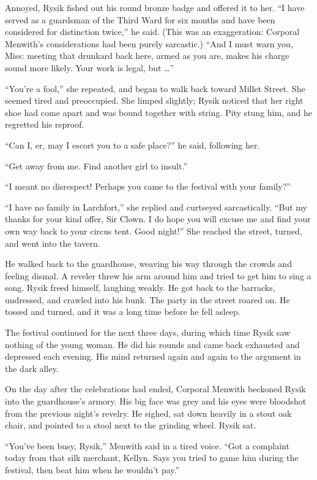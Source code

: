 \documentclass[10pt,a4paper]{article}
\begin{document}
Annoyed, Rysik fished out his round bronze badge and offered it to
her. ``I have served as a guardsman of the Third Ward for six months
and have been considered for distinction twice,'' he said. (This was
an exaggeration: Corporal Menwith's considerations had been purely
sarcastic.) ``And I must warn you, Miss: meeting that drunkard back
here, armed as you are, makes his charge sound more likely. Your
work is legal, but \ldots''

``You're a fool,'' she repeated, and began to walk back toward Millet
Street. She seemed tired and preoccupied. She limped slightly;
Rysik noticed that her right shoe had come apart and was bound
together with string. Pity stung him, and he regretted his reproof.

``Can I, er, may I escort you to a safe place?'' he said, following
her.

``Get away from me. Find another girl to insult.''

``I meant no disrespect! Perhaps you came to the festival with
your family?''

``I have no family in Larchfort,'' she replied and curtseyed
sarcastically. ``But my thanks for your kind offer, Sir Clown. I do
hope you will excuse me and find your own way back to your circus
tent. Good night!'' She reached the street, turned, and went into
the tavern.

He walked back to the guardhouse, weaving his way through the
crowds and feeling dismal. A reveler threw his arm around him and
tried to get him to sing a song. Rysik freed himself, laughing
weakly. He got back to the barracks, undressed, and crawled into
his bunk. The party in the street roared on. He tossed and turned,
and it was a long time before he fell asleep.

\bigskip

The festival continued for the next three days, during which time
Rysik saw nothing of the young woman. He did his rounds and came
back exhausted and depressed each evening. His mind returned again
and again to the argument in the dark alley.

On the day after the celebrations had ended, Corporal Menwith
beckoned Rysik into the guardhouse's armory. His big face was grey
and his eyes were bloodshot from the previous night's revelry. He
sighed, sat down heavily in a stout oak chair, and pointed to a
stool next to the grinding wheel. Rysik sat.

``You've been busy, Rysik,'' Menwith said in a tired voice. ``Got a
complaint today from that silk merchant, Kellyn. Says you tried to
game him during the festival, then beat him when he wouldn't pay.''
\end{document}
